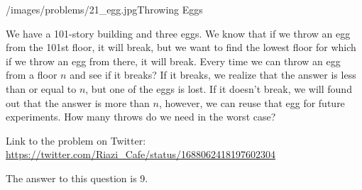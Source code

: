 \begin{problem}{/images/problems/21_egg.jpg}{Throwing Eggs}

We have a 101-story building and three eggs. We know that if we throw an egg from the 101st floor, it will break, but we want to find the lowest floor for which if we throw an egg from there, it will break. Every time we can throw an egg from a  floor $n$ and see if it breaks? If it breaks, we realize that the answer is less than or equal to $n$, but one of the eggs is lost. If it doesn't break, we will found out that the answer is more than $n$, however, we can reuse that egg for future experiments. How many throws do we need in the worst case?

Link to the problem on Twitter:  \url{https://twitter.com/Riazi_Cafe/status/1688062418197602304}\end{problem}
\begin{solution}
The answer to this question is 9.



\end{solution}
